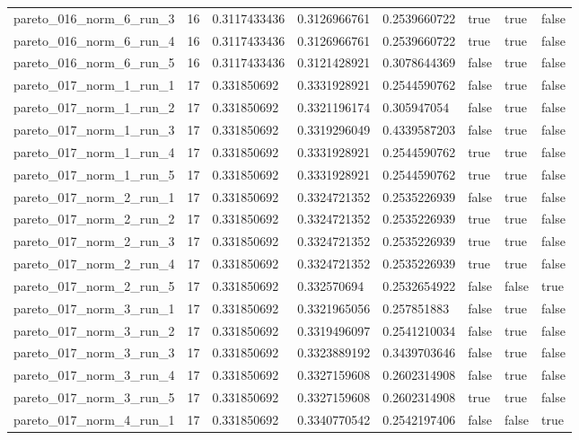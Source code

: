 \begin{tabular}{@{}llllllll@{}}
pareto\_016\_norm\_6\_run\_3 & 16 & 0.3117433436 & 0.3126966761 & 0.2539660722 & true & true & false \\
pareto\_016\_norm\_6\_run\_4 & 16 & 0.3117433436 & 0.3126966761 & 0.2539660722 & true & true & false \\
pareto\_016\_norm\_6\_run\_5 & 16 & 0.3117433436 & 0.3121428921 & 0.3078644369 & false & true & false \\
pareto\_017\_norm\_1\_run\_1 & 17 & 0.331850692 & 0.3331928921 & 0.2544590762 & false & true & false \\
pareto\_017\_norm\_1\_run\_2 & 17 & 0.331850692 & 0.3321196174 & 0.305947054 & false & true & false \\
pareto\_017\_norm\_1\_run\_3 & 17 & 0.331850692 & 0.3319296049 & 0.4339587203 & false & true & false \\
pareto\_017\_norm\_1\_run\_4 & 17 & 0.331850692 & 0.3331928921 & 0.2544590762 & true & true & false \\
pareto\_017\_norm\_1\_run\_5 & 17 & 0.331850692 & 0.3331928921 & 0.2544590762 & true & true & false \\
pareto\_017\_norm\_2\_run\_1 & 17 & 0.331850692 & 0.3324721352 & 0.2535226939 & false & true & false \\
pareto\_017\_norm\_2\_run\_2 & 17 & 0.331850692 & 0.3324721352 & 0.2535226939 & true & true & false \\
pareto\_017\_norm\_2\_run\_3 & 17 & 0.331850692 & 0.3324721352 & 0.2535226939 & true & true & false \\
pareto\_017\_norm\_2\_run\_4 & 17 & 0.331850692 & 0.3324721352 & 0.2535226939 & true & true & false \\
pareto\_017\_norm\_2\_run\_5 & 17 & 0.331850692 & 0.332570694 & 0.2532654922 & false & false & true \\
pareto\_017\_norm\_3\_run\_1 & 17 & 0.331850692 & 0.3321965056 & 0.257851883 & false & true & false \\
pareto\_017\_norm\_3\_run\_2 & 17 & 0.331850692 & 0.3319496097 & 0.2541210034 & false & true & false \\
pareto\_017\_norm\_3\_run\_3 & 17 & 0.331850692 & 0.3323889192 & 0.3439703646 & false & true & false \\
pareto\_017\_norm\_3\_run\_4 & 17 & 0.331850692 & 0.3327159608 & 0.2602314908 & false & true & false \\
pareto\_017\_norm\_3\_run\_5 & 17 & 0.331850692 & 0.3327159608 & 0.2602314908 & true & true & false \\
pareto\_017\_norm\_4\_run\_1 & 17 & 0.331850692 & 0.3340770542 & 0.2542197406 & false & false & true \\

\end{tabular}
